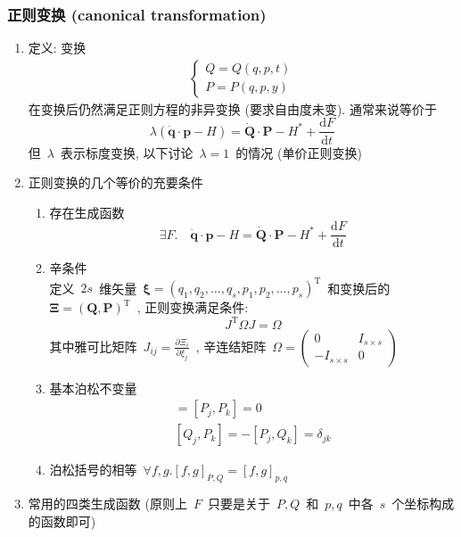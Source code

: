 \documentclass[11pt,a4paper]{article}%
\newcommand{\dif}{\mathrm{d}}
\renewcommand{\[}{~$\displaystyle}
\renewcommand{\]}{$~}%
\begin{document}
  \subsubsection{正则变换 (canonical transformation)}
  \begin{enumerate}
   \item 定义: 变换
    \begin{align*}
    \left\{\begin{aligned}
    Q = Q(q,p,t) \\
    P = P(q,p,y)\end{aligned}\right.
    \end{align*}
    在变换后仍然满足正则方程的非异变换 (要求自由度未变). 通常来说等价于 $$\lambda(\dot{\bm q} \cdot \bm p - H) = \dot{\bm Q}\cdot \bm P - H^* + \frac{\dif F}{\dif t}$$但\[\lambda\]表示标度变换, 以下讨论\[\lambda = 1\]的情况 (单价正则变换)
    \item 正则变换的几个等价的充要条件
    \begin{enumerate}
     \item 存在生成函数$$\exists F. \quad\dot{\bm q} \cdot \bm p  - H = \dot{\bm Q}\cdot \bm P - H^* + \frac{\dif F}{\dif t}$$
     \item 辛条件 \\
     定义\[2s\]维矢量\[\bm\xi = (q_1,q_2,\dots,q_s,p_1,p_2,\dots,p_s)^{\mathrm T}\]和变换后的\[\bm \Xi = (\bm Q,\bm P)^{\mathrm T}\], 正则变换满足条件: 
     $$
     J^{\mathrm T}\Omega J = \Omega
     $$
     其中雅可比矩阵\[J_{ij} = \frac{\partial \Xi_i}{\partial \xi_j}\], 辛连结矩阵\[\Omega = \begin{pmatrix}0&I_{s\times s}\\-I_{s\times s} &0 \end{pmatrix}\]
     \item 基本泊松不变量
      \begin{align*}
       [Q_j, Q_k] = [P_j, P_k] = 0\\
       [Q_j, P_k] = -[P_j, Q_k] = \delta_{jk}
      \end{align*}
     \item 泊松括号的相等\[\forall f,g. [f,g]_{P,Q} = [f,g]_{p,q}\]
    \end{enumerate}
    \item 常用的四类生成函数 (原则上\[F\]只要是关于\[P,Q\]和\[p,q\]中各\[s\]个坐标构成的函数即可)
  \newcommand{\case}[1]{\left\{\begin{aligned}#1\end{aligned}\right.}
    \begin{align*}

\end{align*}
\end{enumerate}
\end{document}
